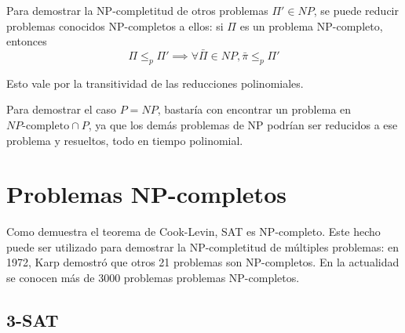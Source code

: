 Para demostrar la NP-completitud de otros problemas $\Pi' \in NP$, se puede reducir problemas conocidos NP-completos a ellos: si $\Pi$ es un problema NP-completo, entonces
$$\Pi \leq_p \Pi' \implies \forall \bar{\Pi} \in NP, \bar{\pi} \leq_p \Pi'$$

Esto vale por la transitividad de las reducciones polinomiales.

Para demostrar el caso $P = NP$, bastaría con encontrar un problema en $NP\text{-completo} \cap P$, ya que los demás problemas de NP podrían ser reducidos a ese problema y resueltos, todo en tiempo polinomial.

\section{Problemas NP-completos}

Como demuestra el teorema de Cook-Levin, SAT es NP-completo. Este hecho puede ser utilizado para demostrar la NP-completitud de múltiples problemas: en 1972, Karp demostró que otros 21 problemas son NP-completos. En la actualidad se conocen más de 3000 problemas problemas NP-completos.

\subsection{3-SAT}
\label{3-sat}

